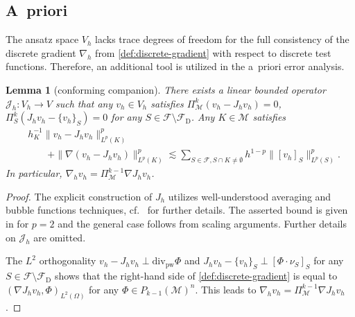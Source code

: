 \documentclass[a4paper]{amsart}
\numberwithin{equation}{section}
\renewcommand{\d}[1]{\,\mathrm{d}#1}
\renewcommand{\div}{\mathrm{div}}
\newcommand{\Mcal}{\mathcal{M}}
\newcommand{\pw}{\mathrm{pw}}
\newtheorem{lemma}[theorem]{Lemma}
\theoremstyle{remark}
\begin{document}
\subsection{A~priori}
The ansatz space $V_h$ lacks trace degrees of freedom for the full consistency of the discrete gradient $\nabla_h$ from \eqref{def:discrete-gradient} with respect to discrete test functions.
Therefore, an additional tool is utilized in the a~priori error analysis.
\begin{lemma}[conforming companion]\label{lem:conforming_companion}
	There exists a linear bounded operator $\mathcal{J}_h : V_h \to V$ such that
	any $v_h \in V_h$ satisfies $\Pi_\Mcal^{k} (v_h - J_h v_h) = 0$, $\Pi_S^{k} (J_h v_h - \{v_h\}_S) = 0$ for any $S \in \mathcal{F} \setminus \mathcal{F}_\mathrm{D}$.  Any $K \in \Mcal$ satisfies 
	\begin{align*}
		&h_K^{-1}\|v_h - J_h v_h\|_{L^p(K)}^p\\
		&\qquad + \|\nabla(v_h - J_h v_h)\|_{L^p(K)}^p \lesssim \sum_{S \in \mathcal{F}, S \cap K \neq \emptyset} h^{1-p}\|[v_h]_S\|_{L^p(S)}^p.
	\end{align*}
	In particular, $\nabla_h v_h = \Pi_\Mcal^{k-1} \nabla J_h v_h$.
\end{lemma}
\begin{proof}
	The explicit construction of $J_h$ utilizes well-understood
	averaging and bubble functions techniques, cf.~\cite{VeeserZanotti2018,ErnZanotti2020} for further details. The asserted bound is given in \cite{VeeserZanotti2018,ErnZanotti2020} for $p = 2$ and the general case follows from scaling arguments. Further details on $\mathcal{J}_h$ are omitted.
    
	The $L^2$ orthogonality $v_h - J_h v_h \perp \div_\pw \Phi$ and $J_h v_h - \{v_h\}_S \perp [\Phi \cdot \nu_S]_S$ for any $S \in \mathcal{F}\setminus\mathcal{F}_\mathrm{D}$ shows that the right-hand side of \eqref{def:discrete-gradient} is equal to $(\nabla J_h v_h, \Phi)_{L^2(\Omega)}$ for any $\Phi \in P_{k-1}(\Mcal)^n$. This leads to
	$\nabla_h v_h = \Pi_\Mcal^{k-1} \nabla J_h v_h$.
\end{proof}
\end{document}
